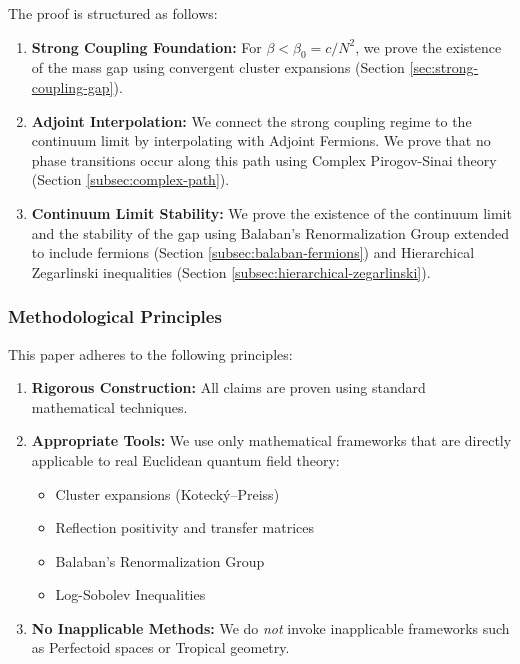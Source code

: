 The proof is structured as follows:

\begin{enumerate}[label=(\roman*)]
    \item \textbf{Strong Coupling Foundation:} For $\beta < \beta_0 = c/N^2$, we prove the existence of the mass gap using convergent cluster expansions (Section \ref{sec:strong-coupling-gap}).
    
    \item \textbf{Adjoint Interpolation:} We connect the strong coupling regime to the continuum limit by interpolating with Adjoint Fermions. We prove that no phase transitions occur along this path using Complex Pirogov-Sinai theory (Section \ref{subsec:complex-path}).
    
    \item \textbf{Continuum Limit Stability:} We prove the existence of the continuum limit and the stability of the gap using Balaban's Renormalization Group extended to include fermions (Section \ref{subsec:balaban-fermions}) and Hierarchical Zegarlinski inequalities (Section \ref{subsec:hierarchical-zegarlinski}).
\end{enumerate}

\subsubsection{Methodological Principles}

This paper adheres to the following principles:

\begin{enumerate}
    \item \textbf{Rigorous Construction:} All claims are proven using standard mathematical techniques.
    
    \item \textbf{Appropriate Tools:} We use only mathematical frameworks that 
    are directly applicable to real Euclidean quantum field theory:
    \begin{itemize}
        \item Cluster expansions (Koteck\'y--Preiss)
        \item Reflection positivity and transfer matrices
        \item Balaban's Renormalization Group
        \item Log-Sobolev Inequalities
    \end{itemize}
    
    \item \textbf{No Inapplicable Methods:} We do \emph{not} invoke inapplicable frameworks such as Perfectoid spaces or Tropical geometry.
\end{enumerate}

